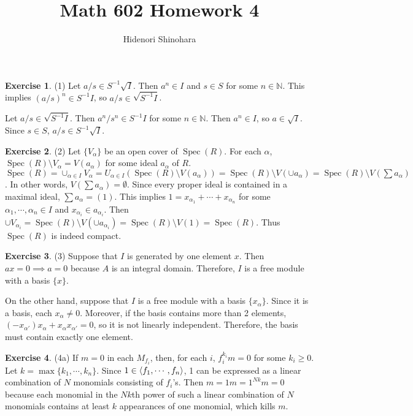 \documentclass[12pt, psamsfonts]{amsart}
\theoremstyle{definition}
\newtheorem*{exer}{Exercise}
\theoremstyle{remark}
\DeclareMathOperator{\Spec}{Spec}
\numberwithin{equation}{section}
\begin{document}
\title{Math 602 Homework 4}
\author{Hidenori Shinohara}
\maketitle

\begin{exer}{(1)}
  Let $a / s \in S^{-1}\sqrt{I}$.
  Then $a^n \in I$ and $s \in S$ for some $n \in \mathbb{N}$.
  This implies $(a / s)^n \in S^{-1}I$, so $a / s \in \sqrt{S^{-1}I}$.

  Let $a / s \in \sqrt{S^{-1}I}$.
  Then $a^n / s^n \in S^{-1}I$ for some $n \in \mathbb{N}$.
  Then $a^n \in I$, so $a \in \sqrt{I}$.
  Since $s \in S$, $a / s \in S^{-1}\sqrt{I}$.
\end{exer}

\begin{exer}{(2)}
  Let $\{ V_{\alpha} \}$ be an open cover of $\Spec(R)$.
  For each $\alpha$, $\Spec(R) \setminus V_{\alpha} = V(a_{\alpha})$ for some ideal $a_{\alpha}$ of $R$.
  $\Spec(R) = \cup_{\alpha \in I} V_{\alpha} = U_{\alpha \in I} (\Spec(R) \setminus V(a_{\alpha})) = \Spec(R) \setminus V(\cup a_{\alpha}) = \Spec(R) \setminus V(\sum a_{\alpha})$.
  In other words, $V(\sum a_{\alpha}) = \emptyset$.
  Since every proper ideal is contained in a maximal ideal, $\sum a_{\alpha} = (1)$.
  This implies $1 = x_{\alpha_1} + \cdots + x_{\alpha_n}$ for some $\alpha_1, \cdots, \alpha_n \in I$ and $x_{\alpha_i} \in a_{\alpha_i}$.
  Then $\cup V_{\alpha_i} = \Spec(R) \setminus V(\cup a_{\alpha_i}) = \Spec(R) \setminus V(1) = \Spec(R)$.
  Thus $\Spec(R)$ is indeed compact.
\end{exer}

\begin{exer}{(3)}
  Suppose that $I$ is generated by one element $x$.
  Then $ax = 0 \implies a = 0$ because $A$ is an integral domain.
  Therefore, $I$ is a free module with a basis $\{ x \}$.
  
  On the other hand, suppose that $I$ is a free module with a basis $\{ x_{\alpha} \}$.
  Since it is a basis, each $x_{\alpha} \ne 0$.
  Moreover, if the basis contains more than 2 elements, $(-x_{\alpha'})x_{\alpha} + x_{\alpha}x_{\alpha'} = 0$, so it is not linearly independent.
  Therefore, the basis must contain exactly one element.
\end{exer}

\begin{exer}{(4a)}
  If $m = 0$ in each $M_{f_i}$, then, for each $i$, $f_i^{k_i}m = 0$ for some $k_i \geq 0$.
  Let $k = \max\{ k_1, \cdots, k_n \}$.
  Since $1 \in \ev{f_1, \cdots, f_n}$, 1 can be expressed as a linear combination of $N$ monomials consisting of $f_i$'s.
  Then $m = 1m = 1^{Nk}m = 0$ because each monomial in the $Nk$th power of such a linear combination of $N$ monomials contains at least $k$ appearances of one monomial, which kills $m$.
\end{exer}
\end{document}
